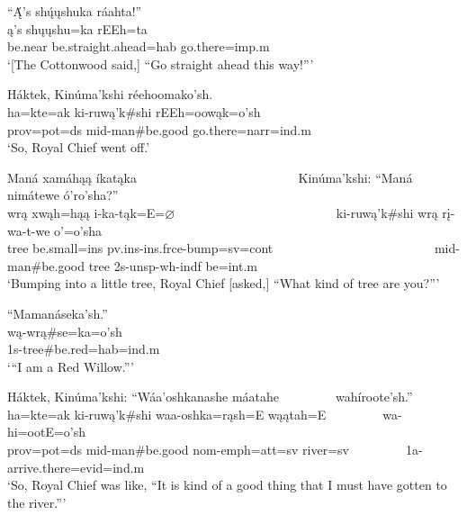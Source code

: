 \begin{exe}
\item\label{EJ97} \glll  ``Ą́'s shų́ųshuka ráahta!''\\
ą's shųųshu=ka rEEh=ta\\
\textnormal{be.near} \textnormal{be.straight.ahead}=hab \textnormal{go.there}=imp.m\\
\glt `[The Cottonwood said,] {``}Go straight ahead this way!{''}'

\item\label{EJ98} \glll Háktek, Kinúma'kshi réehoomako'sh.\\
ha=kte=ak ki-ruwą'k\#shi rEEh=oowąk=o'sh\\
prov=pot=ds mid-\textnormal{man}\#\textnormal{be.good} \textnormal{go.there}=narr=ind.m\\
\glt `So, Royal Chief went off.'

\item\label{EJ99} \glll Maná xamáhąą íkatąka ~ ~ ~ ~ ~ ~ ~ ~ ~ ~ ~ ~ ~ ~ ~ Kinúma'kshi: ``Maná nimátewe ó'ro'sha?''\\
wrą xwąh=hąą i-ka-tąk=E=$\varnothing$ ~ ~ ~ ~ ~ ~ ~ ~ ~ ~ ~ ~ ~ ~ ~ ki-ruwą'k\#shi wrą rį-wa-t-we o'=o'sha\\
\textnormal{tree} \textnormal{be.small}=ins pv.ins-ins.frce-\textnormal{bump}=sv=cont ~ ~ ~ ~ ~ ~ ~ ~ ~ ~ ~ ~ ~ ~ ~ mid-\textnormal{man}\#\textnormal{be.good} \textnormal{tree} 2s-unsp-wh-indf \textnormal{be}=int.m\\
\glt `Bumping into a little tree, Royal Chief [asked,] ``What kind of tree are you?{''}'

\item\label{EJ100} \glll ``Mamanáseka'sh.''\\
wą-wrą\#se=ka=o'sh\\
1s-\textnormal{tree}\#\textnormal{be.red}=hab=ind.m\\
\glt `{``}I am a Red Willow.{''}'

\item\label{EJ101} \glll Háktek, Kinúma'kshi: ``Wáa'oshkanashe máatahe ~ ~ ~ ~ ~ wahíroote'sh.''\\
ha=kte=ak ki-ruwą'k\#shi waa-oshka=rąsh=E wąątah=E ~ ~ ~ ~ ~ wa-hi=ootE=o'sh\\
prov=pot=ds mid-\textnormal{man}\#\textnormal{be.good} nom-emph=att=sv \textnormal{river}=sv ~ ~ ~ ~ ~ 1a-\textnormal{arrive.there}=evid=ind.m\\
\glt `So, Royal Chief was like, ``It is kind of a good thing that I must have gotten to the river.{''}'


\end{exe}
